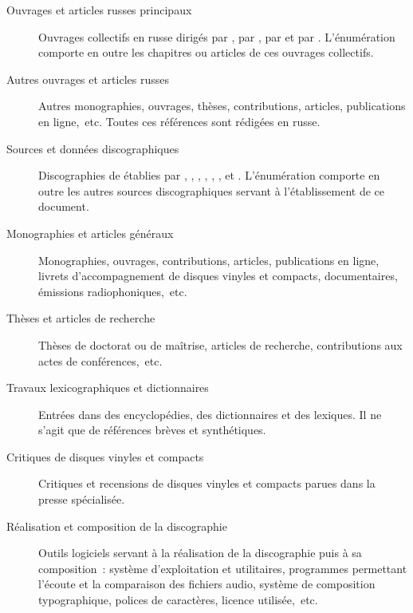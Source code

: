 \begin{description}
 \item[Ouvrages et articles russes principaux]
 Ouvrages collectifs en russe dirigés par \citet{Milshteyn70, Milshteyn82a},
 par \citet{Lobanov03}, par \citet{Nikonovich08} et par \citet{Scriabine}.
 L'énumération comporte en outre les chapitres ou articles de ces ouvrages
 collectifs.
 \item[Autres ouvrages et articles russes]
 Autres monographies, ouvrages, thèses, contributions, articles,
 publications en ligne,~etc.
 Toutes ces références sont rédigées en russe.
 \item[Sources et données discographiques]
 Discographies de \VSofronitsky{} établies par \citet{White}, \citet{Malik},
 \citet{Masuda}, \citet{Taylor}, \citet{Graham}, \citet{Nikonovich11},
 \citet{Rossi} et \citet{Johansson}.
 L'énumération comporte en outre les autres sources discographiques servant
 à l'établissement de ce document.
 \item[Monographies et articles généraux]
 Monographies, ouvrages, contributions, articles, publications en ligne,
 livrets d'accompagnement de disques vinyles et compacts, documentaires,
 émissions radiophoniques,~etc.
 \item[Thèses et articles de recherche]
 Thèses de doctorat ou de maîtrise, articles de recherche, contributions aux
 actes de conférences,~etc.
 \item[Travaux lexicographiques et dictionnaires]
 Entrées dans des encyclopédies, des dictionnaires et des lexiques.
 Il ne s'agit que de références brèves et synthétiques.
 \item[Critiques de disques vinyles et compacts]
 Critiques et recensions de disques vinyles et compacts parues dans la
 presse spécialisée.
 \item[Réalisation et composition de la discographie]
 Outils logiciels servant à la réalisation de la discographie puis à sa
 composition~: système d'exploitation et utilitaires, programmes permettant
 l'écoute et la comparaison des fichiers audio, système de composition
 typographique, polices de caractères, licence utilisée,~etc.
\end{description}

\printbibliography[%
    heading=subbibnumbered,%
    title={Ouvrages et articles russes principaux},%
    keyword=primarysource,%
]
\printbibliography[%
    heading=subbibnumbered,%
    title={Autres ouvrages et articles russes},%
    keyword=othersource,%
]
\printbibliography[%
    heading=subbibnumbered,%
    title={Sources et données discographiques},%
    keyword=discography,%
]
\printbibliography[%
    heading=subbibnumbered,%
    title={Monographies et articles généraux},%
    keyword=bookarticle,%
]
\printbibliography[%
    heading=subbibnumbered,%
    title={Thèses et articles de recherche},%
    keyword=research,%
]
\printbibliography[%
    heading=subbibnumbered,%
    title={Travaux lexicographiques et dictionnaires},%
    keyword=lexicography,%
]
\printbibliography[%
    heading=subbibnumbered,%
    title={Critiques de disques vinyles et compacts},%
    keyword=discrecension,%
]
\printbibliography[%
    heading=subbibnumbered,%
    title={Réalisation et composition de la discographie},%
    keyword=comparetypeset,%
]
